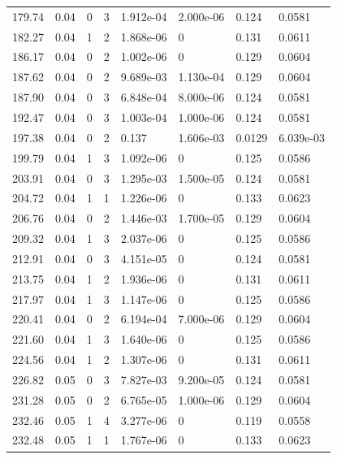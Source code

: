 \documentclass[preview]{standalone}
\begin{document}
{{{\begin{tabular}{L{1.2cm}C{1.2cm} C{0.3cm}C{0.5cm} C{1.4cm}C{1.4cm} C{1.4cm}C{1.4cm}}
  179.74  &  0.04  & 0     &  3 &  1.912e-04  & 2.000e-06  & 0.124 &  0.0581   \\ 
  182.27  &  0.04  & 1     &  2 &  1.868e-06  & 0  & 0.131 &  0.0611   \\ 
  186.17  &  0.04  & 0     &  2 &  1.002e-06  & 0  & 0.129 &  0.0604   \\ 
  187.62  &  0.04  & 0     &  2 &  9.689e-03  & 1.130e-04  & 0.129 &  0.0604   \\ 
  187.90  &  0.04  & 0     &  3 &  6.848e-04  & 8.000e-06  & 0.124 &  0.0581   \\ 
  192.47  &  0.04  & 0     &  3 &  1.003e-04  & 1.000e-06  & 0.124 &  0.0581   \\ 
  197.38  &  0.04  & 0     &  2 &  0.137  & 1.606e-03  & 0.0129 &  6.039e-03   \\ 
  199.79  &  0.04  & 1     &  3 &  1.092e-06  & 0  & 0.125 &  0.0586   \\ 
  203.91  &  0.04  & 0     &  3 &  1.295e-03  & 1.500e-05  & 0.124 &  0.0581   \\ 
  204.72  &  0.04  & 1     &  1 &  1.226e-06  & 0  & 0.133 &  0.0623   \\ 
  206.76  &  0.04  & 0     &  2 &  1.446e-03  & 1.700e-05  & 0.129 &  0.0604   \\ 
  209.32  &  0.04  & 1     &  3 &  2.037e-06  & 0  & 0.125 &  0.0586   \\ 
  212.91  &  0.04  & 0     &  3 &  4.151e-05  & 0  & 0.124 &  0.0581   \\ 
  213.75  &  0.04  & 1     &  2 &  1.936e-06  & 0  & 0.131 &  0.0611   \\ 
  217.97  &  0.04  & 1     &  3 &  1.147e-06  & 0  & 0.125 &  0.0586   \\ 
  220.41  &  0.04  & 0     &  2 &  6.194e-04  & 7.000e-06  & 0.129 &  0.0604   \\ 
  221.60  &  0.04  & 1     &  3 &  1.640e-06  & 0  & 0.125 &  0.0586   \\ 
  224.56  &  0.04  & 1     &  2 &  1.307e-06  & 0  & 0.131 &  0.0611   \\ 
  226.82  &  0.05  & 0     &  3 &  7.827e-03  & 9.200e-05  & 0.124 &  0.0581   \\ 
  231.28  &  0.05  & 0     &  2 &  6.765e-05  & 1.000e-06  & 0.129 &  0.0604   \\ 
  232.46  &  0.05  & 1     &  4 &  3.277e-06  & 0  & 0.119 &  0.0558   \\ 
  232.48  &  0.05  & 1     &  1 &  1.767e-06  & 0  & 0.133 &  0.0623   \\ 

\end{tabular}}}}
\end{document}
